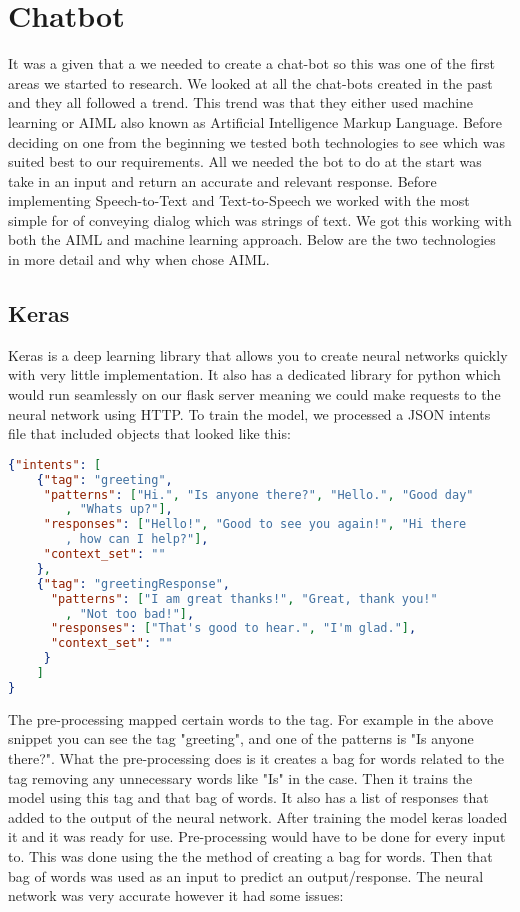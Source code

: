 \section{Chatbot}
It was a given that a we needed to create a chat-bot so this was one of the first areas we started to research. We looked at all the chat-bots created in the past and they all followed a trend. This trend was that they either used machine learning or AIML also known as Artificial Intelligence Markup Language. Before deciding on one from the beginning we tested both technologies to see which was suited best to our requirements. All we needed the bot to do at the start was take in an input and return an accurate and relevant response. Before implementing Speech-to-Text and Text-to-Speech we worked with the most simple for of conveying dialog which was strings of text. We got this working with both the AIML and machine learning
approach. Below are the two technologies in more detail and why when chose AIML.

\subsection{Keras}
Keras is a deep learning library that allows you to create neural networks quickly with very little implementation. It also has a dedicated library for python which would run seamlessly on our flask server meaning we could make requests to the neural network using HTTP. To train the model, we processed a JSON intents file that included objects that looked like this:

\begin{lstlisting}[language=JSON]
{"intents": [
    {"tag": "greeting",
     "patterns": ["Hi.", "Is anyone there?", "Hello.", "Good day"
        , "Whats up?"],
     "responses": ["Hello!", "Good to see you again!", "Hi there
        , how can I help?"],
     "context_set": ""
    },
    {"tag": "greetingResponse",
      "patterns": ["I am great thanks!", "Great, thank you!"
        , "Not too bad!"],
      "responses": ["That's good to hear.", "I'm glad."],
      "context_set": ""
     }
    ]
}
\end{lstlisting}

The pre-processing mapped certain words to the tag. For example in the above snippet you can see the tag "greeting", and one of the patterns is "Is anyone there?". What the pre-processing does is it creates a bag for words related to the tag removing any unnecessary words like "Is" in the case. Then it trains the model using this tag and that bag of words. It also has a list of responses that added to the output of the neural network. After training the model keras loaded it and it was ready for use. Pre-processing would have to be done for every input to. This was done using the the method of creating a bag for words. Then that bag of words was used as an input to predict an output/response. The neural network was very accurate however it had some issues:

